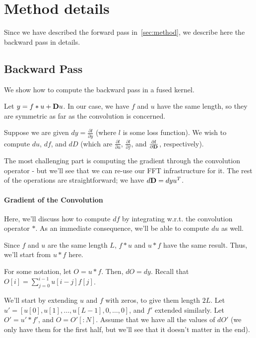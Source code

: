 \section{Method details}
\label{sec:method_details}

Since we have described the forward pass in~\cref{sec:method}, we describe here
the backward pass in details.

\subsection{Backward Pass}
We show how to compute the backward pass in a fused kernel.


Let $y = f \ast u + \mathbf{D} u$.
In our case, we have $f$ and $u$ have the same length, so they are symmetric as far as the convolution is concerned.

Suppose we are given $dy = \frac{\partial l}{\partial y}$ (where $l$ is some loss function).
We wish to compute $du$, $df$, and $dD$ (which are $\frac{\partial l}{\partial u}$, $\frac{\partial l}{\partial f}$, and $\frac{\partial l}{\partial \mathbf{D}}$, respectively).

The most challenging part is computing the gradient through the convolution operator - but we'll see that we can re-use our FFT infrastructure for it.
The rest of the operations are straightforward; we have $d\mathbf{D} = dy u^T$.

\paragraph{Gradient of the Convolution}

Here, we'll discuss how to compute $df$ by integrating w.r.t. the convolution operator $\ast$.
As an immediate consequence, we'll be able to compute $du$ as well.

Since $f$ and $u$ are the same length $L$, $f \ast u$ and $u \ast f$ have the same result.
Thus, we'll start from $u \ast f$ here.

For some notation, let $O = u \ast f$.
Then, $dO = dy$.
Recall that $O[i] = \sum_{j=0}^{i-1} u[i-j]f[j]$.

We'll start by extending $u$ and $f$ with zeros, to give them length $2L$.
Let $u' = [u[0], u[1], \dots, u[L-1], 0, \dots, 0]$, and $f'$ extended similarly.
Let $O' = u' \ast f'$, and $O = O'[:N]$.
Assume that we have all the values of $dO'$ (we only have them for the first half, but we'll see that it doesn't matter in the end).

